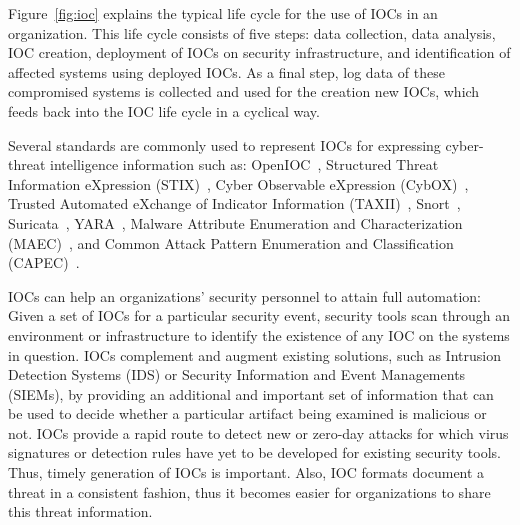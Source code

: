Figure~\ref{fig:ioc} explains the typical life cycle for the use of IOCs in an organization. This life cycle consists of five steps: data collection, data analysis, IOC creation, deployment of IOCs on security infrastructure, and identification of affected systems using deployed IOCs. As a final step, log data of these compromised systems is collected and used for the creation new IOCs, which feeds back into the IOC life cycle in a cyclical way.

Several standards are commonly used to represent IOCs for expressing cyber-threat intelligence information such as: OpenIOC~\cite{openioc}, Structured Threat Information eXpression (STIX)~\cite{stix}, Cyber Observable eXpression (CybOX)~\cite{cybox}, Trusted Automated eXchange of Indicator Information (TAXII)~\cite{taxii}, Snort~\cite{snort}, Suricata~\cite{suricata}, YARA~\cite{yara}, Malware Attribute Enumeration and Characterization (MAEC)~\cite{maec}, and Common Attack Pattern Enumeration and Classification (CAPEC)~\cite{capec}.

IOCs can help an organizations' security personnel to attain full automation: Given a set of IOCs for a particular security event, security tools scan through an environment or infrastructure to identify the existence of any IOC on the systems in question. IOCs complement and augment existing solutions, such as Intrusion Detection Systems (IDS) or Security Information and Event Managements (SIEMs), by providing an additional and important set of information that can be used to decide whether a particular artifact being examined is malicious or not. IOCs provide a rapid route to detect new or zero-day attacks for which virus signatures or detection rules have yet to be developed for existing security tools. Thus, timely generation of IOCs is important. Also, IOC formats document a threat in a consistent fashion, thus it becomes easier for organizations to share this threat information. 

